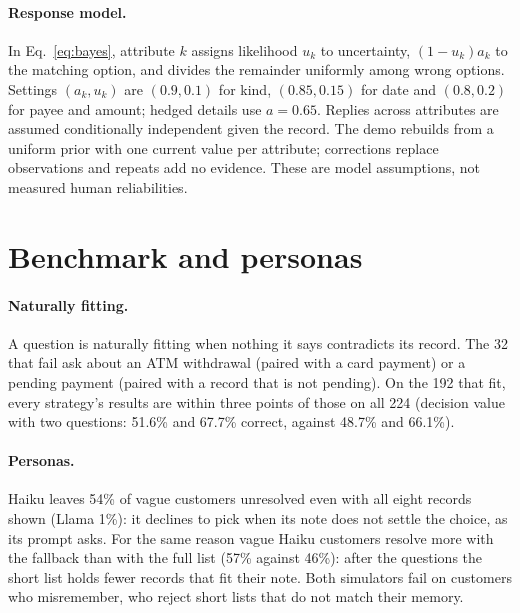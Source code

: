 \documentclass[11pt]{article}
\begin{document}
\paragraph{Response model.} In Eq.~\ref{eq:bayes}, attribute $k$ assigns likelihood $u_k$ to
uncertainty, $(1-u_k)a_k$ to the matching option, and divides the remainder uniformly among
wrong options. Settings $(a_k,u_k)$ are $(0.9,0.1)$ for kind, $(0.85,0.15)$ for date and
$(0.8,0.2)$ for payee and amount; hedged details use $a=0.65$. Replies across attributes are assumed
conditionally independent given the record. The demo rebuilds from a uniform prior with one
current value per attribute; corrections replace observations and repeats add no evidence.
These are model assumptions, not measured human reliabilities.

\section{Benchmark and personas}
\label{app:bench}

\paragraph{Naturally fitting.} A question is naturally fitting when nothing it says contradicts its
record. The 32 that fail ask about an ATM withdrawal (paired with a card payment) or a pending
payment (paired with a record that is not pending). On the 192 that fit, every strategy's results
are within three points of those on all 224 (decision value with two questions: 51.6\% and 67.7\%
correct, against 48.7\% and 66.1\%).

\paragraph{Personas.} Haiku leaves 54\% of vague customers unresolved even with all eight records
shown (Llama 1\%): it declines to pick when its note does not settle the choice, as its prompt asks.
For the same reason vague Haiku customers resolve more with the fallback than with the full list
(57\% against 46\%): after the questions the short list holds fewer records that fit their note.
Both simulators fail on customers who misremember, who reject short lists that do not match their
memory.
\end{document}
